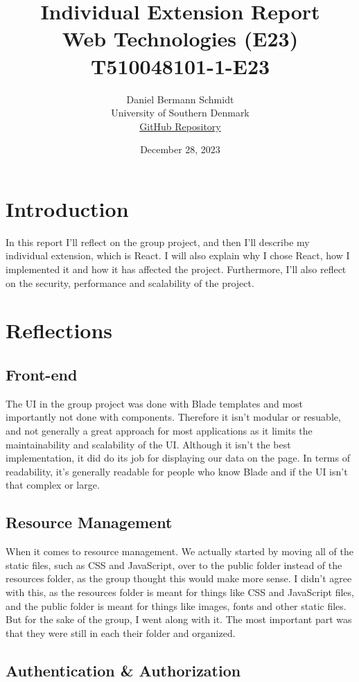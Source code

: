 \documentclass[letterpaper,twocolumn]{article}
\title{Individual Extension Report\\Web Technologies (E23)\\T510048101-1-E23}
\author{Daniel Bermann Schmidt\\University of Southern Denmark\\\href{https://github.com/Kururururururururu/MovielibLaravel/tree/Daniel_individuel_part}{GitHub Repository}}
\date{December 28, 2023}
\begin{document}
\maketitle

\section{Introduction}
In this report I'll reflect on the group project, and then I'll describe my individual extension, which is React.
I will also explain why I chose React, how I implemented it and how it has affected the project.
Furthermore, I'll also reflect on the security, performance and scalability of the project.

\section{Reflections}
\subsection{Front-end}

The UI in the group project was done with Blade templates and most importantly not done with components.
Therefore it isn't modular or resuable, and not generally a great approach for most applications as it limits the maintainability and scalability of the UI.
Although it isn't the best implementation, it did do its job for displaying our data on the page.
In terms of readability, it's generally readable for people who know Blade and if the UI isn't that complex or large.

\subsection{Resource Management}
When it comes to resource management.
We actually started by moving all of the static files, such as CSS and JavaScript, over to the public folder instead of the resources folder, as the group thought this would make more sense.
I didn't agree with this, as the resources folder is meant for things like CSS and JavaScript files, and the public folder is meant for things like images, fonts and other static files.
But for the sake of the group, I went along with it. The most important part was that they were still in each their folder and organized.

\subsection{Authentication \& Authorization}
\end{document}
